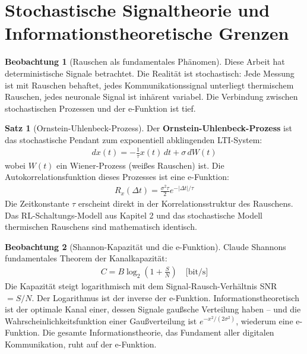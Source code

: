 ﻿\documentclass[a4paper,12pt]{report}
\theoremstyle{definition}
\newtheorem{satz}{Satz}
\newtheorem{beobachtung}{Beobachtung}
\begin{document}
	\section{Stochastische Signaltheorie und Informationstheoretische Grenzen}
	
	\begin{beobachtung}[Rauschen als fundamentales Phänomen]
		Diese Arbeit hat deterministische Signale betrachtet. Die Realität ist stochastisch: Jede Messung ist mit Rauschen behaftet, jedes Kommunikationssignal unterliegt thermischem Rauschen, jedes neuronale Signal ist inhärent variabel. Die Verbindung zwischen stochastischen Prozessen und der e-Funktion ist tief.
	\end{beobachtung}
	
	\begin{satz}[Ornstein-Uhlenbeck-Prozess]
		Der \textbf{Ornstein-Uhlenbeck-Prozess} ist das stochastische Pendant zum exponentiell abklingenden LTI-System:
		\begin{align}
			dx(t) = -\frac{1}{\tau} x(t)\, dt + \sigma\, dW(t)
		\end{align}
		wobei $W(t)$ ein Wiener-Prozess (weißes Rauschen) ist. Die Autokorrelationsfunktion dieses Prozesses ist eine e-Funktion:
		\begin{align}
			R_x(\Delta t) = \frac{\sigma^2 \tau}{2} e^{-|\Delta t|/\tau}
		\end{align}
		Die Zeitkonstante $\tau$ erscheint direkt in der Korrelationsstruktur des Rauschens. Das RL-Schaltungs-Modell aus Kapitel 2 und das stochastische Modell thermischen Rauschens sind mathematisch identisch.
	\end{satz}
	
	\begin{beobachtung}[Shannon-Kapazität und die e-Funktion]
		Claude Shannons fundamentales Theorem der Kanalkapazität:
		\begin{align}
			C = B \log_2\left(1 + \frac{S}{N}\right) \quad \text{[bit/s]}
		\end{align}
		Die Kapazität steigt logarithmisch mit dem Signal-Rausch-Verhältnis SNR $= S/N$. Der Logarithmus ist der inverse der e-Funktion. Informationstheoretisch ist der optimale Kanal einer, dessen Signale gaußsche Verteilung haben -- und die Wahrscheinlichkeitsfunktion einer Gaußverteilung ist $e^{-x^2/(2\sigma^2)}$, wiederum eine e-Funktion. Die gesamte Informationstheorie, das Fundament aller digitalen Kommunikation, ruht auf der e-Funktion.
	\end{beobachtung}
	
\end{document}
